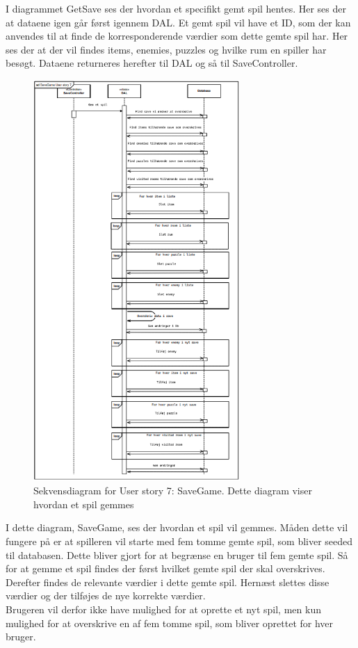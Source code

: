 I diagrammet GetSave ses der hvordan et specifikt gemt spil hentes. Her ses der at dataene igen går først igennem DAL. Et gemt spil vil have et ID, som der kan anvendes til at finde de korresponderende værdier som dette gemte spil har. Her ses der at der vil findes items, enemies, puzzles og hvilke rum en spiller har besøgt. Dataene returneres herefter til DAL og så til SaveController.

\begin{figure}[H]
\centering
\includegraphics[width = 0.7\textwidth]{02-Body/Images/SaveGameDB.png}
\caption{Sekvensdiagram for User story 7: SaveGame. Dette diagram viser hvordan et spil gemmes}
\label{fig:SaveGameDB}
\end{figure}

I dette diagram, SaveGame, ses der hvordan et spil vil gemmes. Måden dette vil fungere på er at spilleren vil starte med fem tomme gemte spil, som bliver seeded til databasen. Dette bliver gjort for at begrænse en bruger til fem gemte spil. Så for at gemme et spil findes der først hvilket gemte spil der skal overskrives. Derefter findes de relevante værdier i dette gemte spil. Hernæst slettes disse værdier og der tilføjes de nye korrekte værdier.\\
Brugeren vil derfor ikke have mulighed for at oprette et nyt spil, men kun mulighed for at overskrive en af fem tomme spil, som bliver oprettet for hver bruger.



